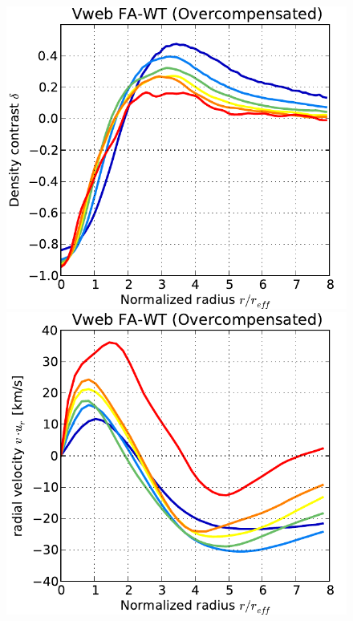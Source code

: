\documentclass[a4,useAMS,usenatbib,usegraphicx]{mn2e}
\begin{document}
\begin{figure}
  
  \includegraphics[trim = 1mm 0mm 5mm 0mm, clip, keepaspectratio=true,
  width=0.24\textheight]{voids_density_VwebFAG1.pdf}
  \includegraphics[trim = 1mm 0mm 5mm 0mm, clip, keepaspectratio=true,
  width=0.24\textheight]{voids_velocity_VwebFAG1.pdf}

\end{figure}
\end{document}
